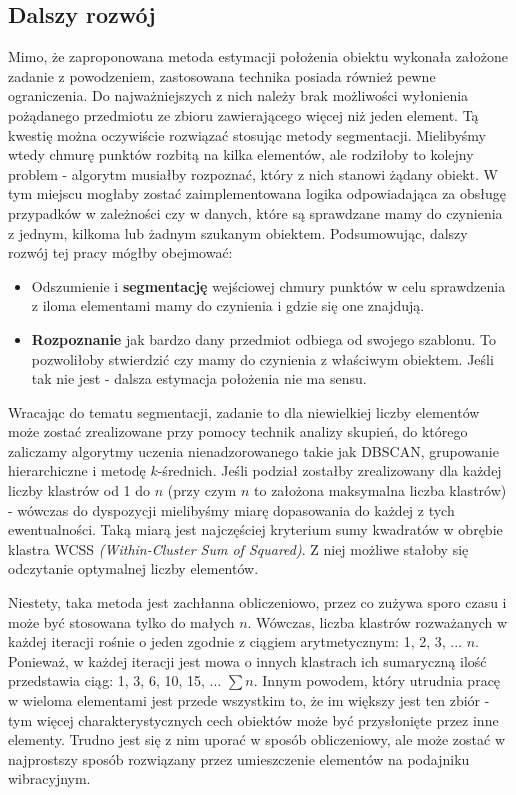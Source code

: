 \documentclass{article}
\begin{document}
\subsection{\LARGE{Dalszy rozwój}}
Mimo, że zaproponowana metoda estymacji położenia obiektu wykonała założone zadanie z powodzeniem, zastosowana technika posiada również pewne ograniczenia. Do najważniejszych z nich należy brak możliwości wyłonienia pożądanego przedmiotu ze zbioru zawierającego więcej niż jeden element. Tą kwestię można oczywiście rozwiązać stosując metody segmentacji. Mielibyśmy wtedy chmurę punktów rozbitą na kilka elementów, ale rodziłoby to kolejny problem - algorytm musiałby rozpoznać, który z nich stanowi żądany obiekt. W tym miejscu mogłaby zostać zaimplementowana logika odpowiadająca za obsługę przypadków w zależności czy w danych, które są sprawdzane mamy do czynienia z jednym, kilkoma lub żadnym szukanym obiektem. Podsumowując, dalszy rozwój tej pracy mógłby obejmować:

\begin{itemize}
\item Odszumienie i \textbf{segmentację} wejściowej chmury punktów w celu sprawdzenia z iloma elementami mamy do czynienia i gdzie się one znajdują.

\item \textbf{Rozpoznanie} jak bardzo dany przedmiot odbiega od swojego szablonu. To pozwoliłoby stwierdzić czy mamy do czynienia z właściwym obiektem. Jeśli tak nie jest - dalsza estymacja położenia nie ma sensu.
\end{itemize}

Wracając do tematu segmentacji, zadanie to dla niewielkiej liczby elementów może zostać zrealizowane przy pomocy technik analizy skupień, do którego zaliczamy algorytmy uczenia nienadzorowanego takie jak DBSCAN, grupowanie hierarchiczne i metodę $k$-średnich. Jeśli podział zostałby zrealizowany dla każdej liczby klastrów od 1 do $n$ (przy czym $n$ to założona maksymalna liczba klastrów) - wówczas do dyspozycji mielibyśmy miarę dopasowania do każdej z tych ewentualności. Taką miarą jest najczęściej kryterium sumy kwadratów w obrębie klastra WCSS \emph{(Within-Cluster Sum of Squared)}. Z niej możliwe stałoby się odczytanie optymalnej liczby elementów. 

Niestety, taka metoda jest zachłanna obliczeniowo, przez co zużywa sporo czasu i może być stosowana tylko do małych $n$. Wówczas, liczba klastrów rozważanych w każdej iteracji rośnie o jeden zgodnie z ciągiem arytmetycznym: 1, 2, 3, ... $n$. Ponieważ, w każdej iteracji jest mowa o innych klastrach ich sumaryczną ilość przedstawia ciąg: 1, 3, 6, 10, 15, ... $\sum n$. Innym powodem, który utrudnia pracę w wieloma elementami jest przede wszystkim to, że im większy jest ten zbiór - tym więcej charakterystycznych cech obiektów może być przysłonięte przez inne elementy. Trudno jest się z nim uporać w sposób obliczeniowy, ale może zostać w najprostszy sposób rozwiązany przez umieszczenie elementów na podajniku wibracyjnym.
\end{document}
